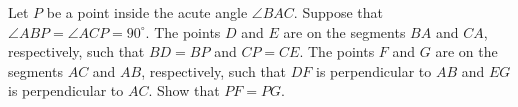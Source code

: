 Let $P$ be a point inside the acute angle $\angle BAC$. Suppose that $\angle ABP = \angle ACP = 90^{\circ}$. The points $D$ and $E$ are on the segments $BA$ and $CA$,  respectively, such that $BD = BP$ and $CP = CE$. The points $F$ and $G$ are on the segments $AC$ and $AB$,  respectively, such that $DF$ is perpendicular to $AB$ and $EG$ is perpendicular to $AC$. Show that $PF = PG$.